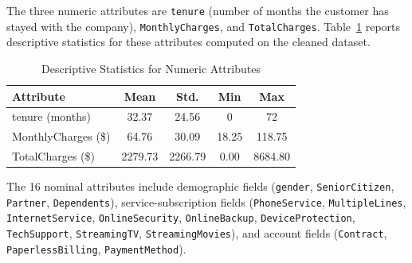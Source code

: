 \documentclass[conference]{IEEEtran}
\begin{document}
	The three numeric attributes are \texttt{tenure} (number of months the customer has stayed with the company), \texttt{MonthlyCharges}, and \texttt{TotalCharges}. Table~\ref{tab:numstats} reports descriptive statistics for these attributes computed on the cleaned dataset.
	
	\begin{table}[htbp]
		\caption{Descriptive Statistics for Numeric Attributes}
		\begin{center}
			\begin{tabular}{|l|c|c|c|c|}
				\hline
				\textbf{Attribute} & \textbf{Mean} & \textbf{Std.} & \textbf{Min} & \textbf{Max} \\
				\hline
				tenure (months) & 32.37 & 24.56 & 0 & 72 \\
				\hline
				MonthlyCharges (\$) & 64.76 & 30.09 & 18.25 & 118.75 \\
				\hline
				TotalCharges (\$) & 2279.73 & 2266.79 & 0.00 & 8684.80 \\
				\hline
			\end{tabular}
			\label{tab:numstats}
		\end{center}
	\end{table}
	
	The 16 nominal attributes include demographic fields (\texttt{gender}, \texttt{SeniorCitizen}, \texttt{Partner}, \texttt{Dependents}), service-subscription fields (\texttt{PhoneService}, \texttt{MultipleLines}, \texttt{InternetService}, \texttt{OnlineSecurity}, \texttt{OnlineBackup}, \texttt{DeviceProtection}, \texttt{TechSupport}, \texttt{StreamingTV}, \texttt{StreamingMovies}), and account fields (\texttt{Contract}, \texttt{PaperlessBilling}, \texttt{PaymentMethod}).
	
\end{document}
